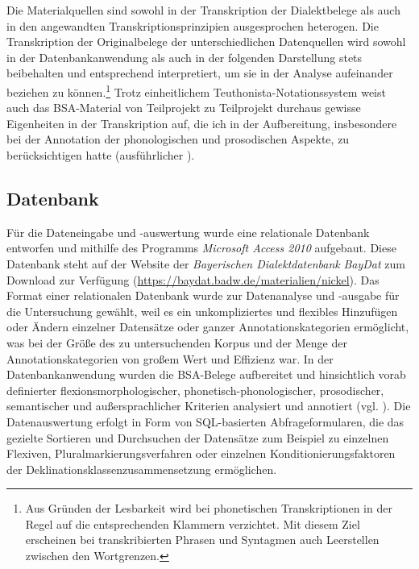 Die Materialquellen sind sowohl in der Transkription der Dialektbelege als auch in den angewandten Transkriptionsprinzipien ausgesprochen heterogen. Die Transkription der Originalbelege der unterschiedlichen Datenquellen wird sowohl in der Datenbankanwendung als auch in der folgenden Darstellung stets beibehalten und entsprechend interpretiert, um sie in der Analyse aufeinander beziehen zu können.\footnote{Aus Gründen der Lesbarkeit wird bei phonetischen Transkriptionen in der Regel auf die entsprechenden Klammern verzichtet. Mit diesem Ziel erscheinen bei transkribierten Phrasen und Syntagmen auch Leerstellen zwischen den Wortgrenzen.} Trotz einheitlichem Teuthonista-Notationssystem weist auch das BSA-Material von Teilprojekt zu Teilprojekt durchaus gewisse Eigenheiten in der Transkription auf, die ich in der Aufbereitung, insbesondere bei der Annotation der phonologischen und prosodischen Aspekte, zu berücksichtigen hatte (ausführlicher ).

\subsection{Datenbank}
\label{sec:6.3.1}
Für die Dateneingabe und -auswertung wurde eine relationale Datenbank entworfen und mithilfe des Programms \textit{Microsoft Access 2010} aufgebaut. Diese Datenbank steht auf der Website der \textit{Bayerischen Dialektdatenbank} \textit{BayDat} zum Download zur Verfügung (\url{https://baydat.badw.de/materialien/nickel}). Das Format einer relationalen Datenbank wurde zur Datenanalyse und -ausgabe für die Untersuchung gewählt, weil es ein unkompliziertes und flexibles Hinzufügen oder Ändern einzelner Datensätze oder ganzer Annotationskategorien ermöglicht, was bei der Größe des zu untersuchenden Korpus und der Menge der Annotationskategorien von großem Wert und Effizienz war. In der Datenbankanwendung wurden die BSA-Belege aufbereitet und hinsichtlich vorab definierter flexionsmorphologischer, phonetisch-phonologischer, prosodischer, semantischer und außersprachlicher Kriterien analysiert und annotiert (vgl. ). Die Datenauswertung erfolgt in Form von SQL-basierten Abfrageformularen, die das gezielte Sortieren und Durchsuchen der Datensätze zum Beispiel zu einzelnen Flexiven, Pluralmarkierungsverfahren oder einzelnen Konditionierungsfaktoren der Deklinationsklassenzusammensetzung ermöglichen.

